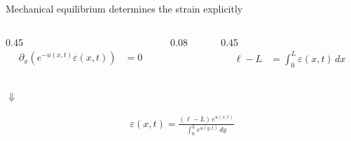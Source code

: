 \begin{frame}{Mechanical equilibrium determines the strain explicitly}

  \vspace{0.10cm}

  \begin{columns}[c,onlytextwidth]
    \begin{column}{0.45\textwidth}
      \centering
      {\color{HydraWhite}\fontsize{9.6}{12.2}\selectfont
      \begin{align*}
        \partial_x\!\left(e^{-u(x,t)}\varepsilon(x,t)\right)&=0
      \end{align*}
      }
    \end{column}

    \begin{column}{0.08\textwidth}
      \centering{\color{HydraCyan}\fontsize{18}{18}\selectfont $+$}
    \end{column}

    \begin{column}{0.45\textwidth}
      \centering
      {\color{HydraWhite}\fontsize{9.6}{12.2}\selectfont
      \begin{align*}
        \ell-L
        &=\int_0^L\varepsilon(x,t)\,dx
      \end{align*}
      }
    \end{column}
  \end{columns}

  \vspace{0.30cm}

  \begin{center}{\color{HydraCyan}\fontsize{18}{18}\selectfont $\Downarrow$}\end{center}

  \vspace{0.10cm}

  {\color{HydraGold}\bfseries\fontsize{12.5}{15.8}\selectfont
  \begin{align*}
    \boxed{
      \varepsilon(x,t)
      =
      \frac{(\ell-L)\,e^{u(x,t)}}
      {\displaystyle\int_0^L e^{u(y,t)}\,dy}
    }
  \end{align*}
  }

\end{frame}


